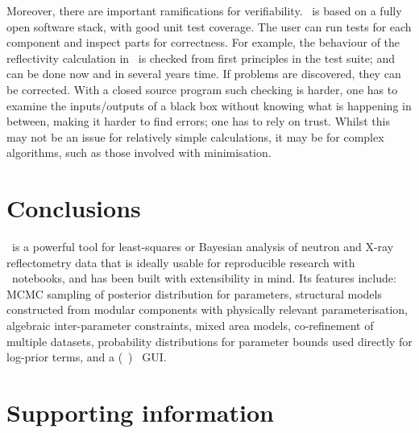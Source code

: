 \documentclass[pdf,preprint]{iucr}
\begin{document}
Moreover, there are important ramifications for verifiability. \ is based on a fully open software stack, with good unit test coverage. The user can run tests for each component and inspect parts for correctness. For example, the behaviour of the reflectivity calculation in \ is checked from first principles in the test suite; and can be done now and in several years time. If problems are discovered, they can be corrected. With a closed source program such checking is harder, one has to examine the inputs/outputs of a black box without knowing what is happening in between, making it harder to find errors; one has to rely on trust. Whilst this may not be an issue for relatively simple calculations, it may be for complex algorithms, such as those involved with minimisation.

\section{Conclusions}\label{conclusions}

\ is a powerful tool for least-squares or Bayesian analysis of neutron and X-ray reflectometry data that is ideally usable for reproducible research with \Jupyter\ notebooks, and has been built with extensibility in mind. Its features include: MCMC sampling of posterior distribution for parameters, structural models constructed from modular components with physically relevant parameterisation, algebraic inter-parameter constraints, mixed area models, co-refinement of multiple datasets, probability distributions for parameter bounds used directly for log-prior terms, and a (\Jupyter\ ) \ipywidgets\ GUI.


\section{Supporting information}
\end{document}
